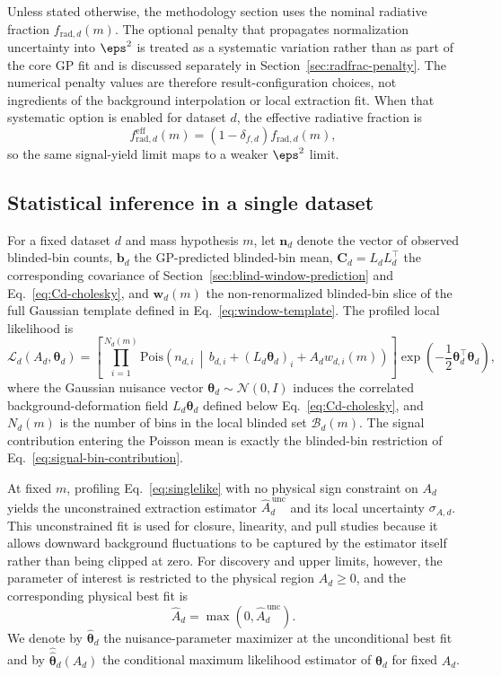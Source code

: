 Unless stated otherwise, the methodology section uses the nominal radiative fraction
$f_{\mathrm{rad},d}(m)$. The optional penalty that propagates normalization uncertainty
into $\eps^2$ is treated as a systematic variation rather than as part of the core GP
fit and is discussed separately in Section~\ref{sec:radfrac-penalty}. The numerical
penalty values are therefore result-configuration choices, not ingredients of the
background interpolation or local extraction fit. When that systematic option is
enabled for dataset $d$, the effective radiative fraction is
\begin{equation}
f_{\mathrm{rad},d}^{\mathrm{eff}}(m)
= \left(1-\delta_{f,d}\right) f_{\mathrm{rad},d}(m),
\end{equation}
so the same signal-yield limit maps to a weaker $\eps^2$ limit.

\subsection{Statistical inference in a single dataset}

For a fixed dataset $d$ and mass hypothesis $m$, let $\bm{n}_d$ denote the vector of
observed blinded-bin counts, $\bm{b}_d$ the GP-predicted blinded-bin mean,
$\bm{C}_d=L_dL_d^\top$ the corresponding covariance of
Section~\ref{sec:blind-window-prediction} and Eq.~\eqref{eq:Cd-cholesky}, and
$\bm{w}_d(m)$ the
non-renormalized blinded-bin slice of the full Gaussian template defined in
Eq.~\eqref{eq:window-template}. The profiled local likelihood is
\begin{equation}
\mathcal{L}_d(A_d,\bm{\theta}_d)
=
\left[
\prod_{i=1}^{N_d(m)}
\mathrm{Pois}\!\left(
n_{d,i}\,\middle|\,
b_{d,i} + (L_d\bm{\theta}_d)_i + A_d w_{d,i}(m)
\right)
\right]
\exp\!\left(-\frac{1}{2}\bm{\theta}_d^\top\bm{\theta}_d\right),
\label{eq:singlelike}
\end{equation}
where the Gaussian nuisance vector $\bm{\theta}_d\sim\mathcal{N}(0,I)$ induces the
correlated background-deformation field $L_d\bm{\theta}_d$ defined below
Eq.~\eqref{eq:Cd-cholesky}, and $N_d(m)$ is the number of bins in the local blinded
set $\mathcal{B}_d(m)$. The signal contribution entering the Poisson mean is exactly
the blinded-bin restriction of Eq.~\eqref{eq:signal-bin-contribution}.

At fixed $m$, profiling Eq.~\eqref{eq:singlelike} with no physical sign constraint on
$A_d$ yields the unconstrained extraction estimator $\hat A_d^{\,\mathrm{unc}}$ and
its local uncertainty $\sigma_{A,d}$. This unconstrained fit is used for closure,
linearity, and pull studies because it allows downward background fluctuations to be
captured by the estimator itself rather than being clipped at zero. For discovery and
upper limits, however, the parameter of interest is restricted to the
physical region $A_d\ge0$, and the corresponding physical best fit is
\begin{equation}
\hat A_d = \max\!\left(0,\hat A_d^{\,\mathrm{unc}}\right).
\end{equation}
We denote by $\hat{\bm{\theta}}_d$ the nuisance-parameter maximizer at the
unconditional best fit and by $\hat{\hat{\bm{\theta}}}_d(A_d)$ the conditional maximum
likelihood estimator of $\bm{\theta}_d$ for fixed $A_d$.

